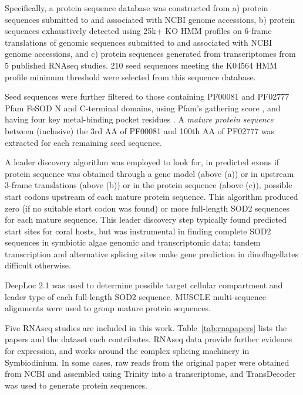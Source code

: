 Specifically, a protein sequence database was constructed from a) protein
sequences submitted to and associated with NCBI genome accessions, b) protein
sequences exhaustively detected using 25k+ KO HMM profiles \cite{kegg} on
6-frame translations of genomic sequences submitted to and associated with NCBI
genome accessions, and c) protein sequences generated from transcriptomes from
5 published RNAseq studies. 210 seed sequences meeting the K04564 HMM profile
minimum threshold \cite{kofam} were selected from this sequence database.

Seed sequences were further filtered to those containing PF00081 and PF02777
Pfam FeSOD N and C-terminal domains, using Pfam's gathering score
\cite{pfam}, and having four key metal-binding pocket residues
\cite{perry2010bbapap}. A \textit{mature protein sequence} between
(inclusive) the 3rd AA of PF00081 and 100th AA of PF02777 was extracted for
each remaining seed sequence.

A leader discovery algorithm was employed to look for, in predicted exons if
protein sequence was obtained through a gene model (above (a)) or in upstream
3-frame translations (above (b)) or in the protein sequence (above (c)),
possible start codons upstream of each mature protein sequence. This algorithm
produced zero (if no suitable start codon was found) or more full-length SOD2
sequences for each mature sequence. This leader discovery step typically found
predicted start sites for coral hosts, but was instrumental in finding complete
SOD2 sequences in symbiotic algae genomic and transcriptomic data; tandem
transcription \cite{zhang2007microb} and alternative splicing sites
\cite{gyoja2013currentbio} make gene prediction in dinoflagellates difficult
otherwise.

DeepLoc 2.1 \cite{deeploc21} was used to determine possible target cellular
compartment and leader type of each full-length SOD2 sequence. MUSCLE
multi-sequence alignments \cite{muscle} were used to group mature protein
sequences.

Five RNAseq studies are included in this work. Table~\ref{tab:rnapapers} lists
the papers and the dataset each contributes. RNAseq data provide further
evidence for expression, and works around the complex splicing machinery in
Symbiodinium. In some cases, raw reads from the original paper were obtained
from NCBI and assembled using Trinity \cite{trinity} into a transcriptome,
and TransDecoder \cite{trinity} was used to generate protein sequences.

